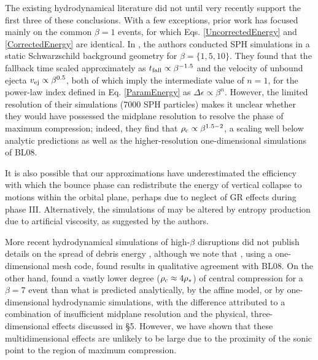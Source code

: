 \documentclass[useAMS, twocolumn, usenatbib]{mn2e}
\begin{document}
The existing hydrodynamical literature did not until very recently support the first three of these conclusions.  With a few exceptions, prior work has focused mainly on the common $\beta=1$ events, for which Eqs. \ref{UncorrectedEnergy} and \ref{CorrectedEnergy} are identical.  In \citet{Laguna+93}, the authors conducted SPH simulations in a static Schwarzschild background geometry for $\beta=\{1, 5, 10\}$.  They found that the fallback time scaled approximately as $t_{\rm fall} \propto \beta^{-1.5}$ and the velocity of unbound ejecta $v_{\rm ej} \propto \beta^{0.5}$, both of which imply the intermediate value of $n=1$, for the power-law index defined in Eq. \ref{ParamEnergy} as $\Delta\epsilon \propto \beta^n$.  However, the limited resolution of their simulations (7000 SPH particles) makes it unclear whether they would have possessed the midplane resolution to resolve the phase of maximum compression; indeed, they find that $\rho_{\rm c} \propto \beta^{1.5-2}$, a scaling well below analytic predictions as well as the higher-resolution one-dimensional simulations of BL08.  

It is also possible that our approximations have underestimated the efficiency with which the bounce phase can redistribute the energy of vertical collapse to motions within the orbital plane, perhaps due to neglect of GR effects during phase III.  Alternatively, the simulations of \citet{Laguna+93} may be altered by entropy production due to artificial viscosity, as suggested by the authors.

More recent hydrodynamical simulations of high-$\beta$ disruptions did not publish details on the spread of debris energy \citep{Kobayashi+04, Guillochon+09}, although we note that \citet{Kobayashi+04}, using a one-dimensional mesh code, found results in qualitative agreement with BL08.  On the other hand, \citet{Guillochon+09} found a vastly lower degree ($\rho_{\rm c}\approx 4\rho_*$) of central compression for a $\beta=7$ event than what is predicted analytically, by the affine model, or by one-dimensional hydrodynamic simulations, with the difference attributed to a combination of insufficient midplane resolution and the physical, three-dimensional effects discussed in \S 5.  However, we have shown that these multidimensional effects are unlikely to be large due to the proximity of the sonic point to the region of maximum compression.
\end{document}
